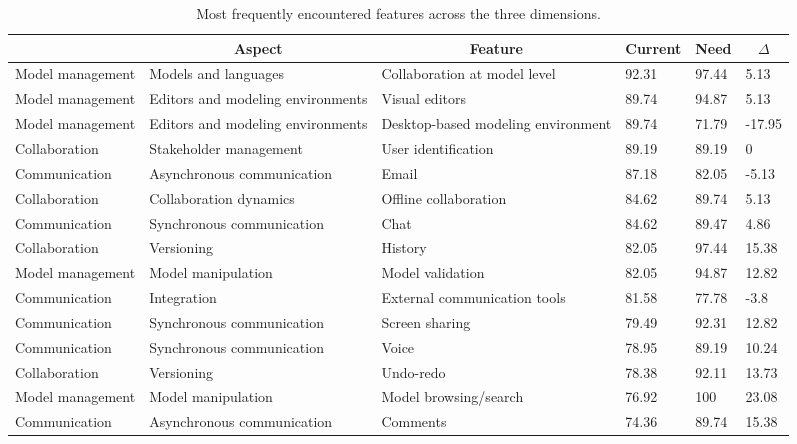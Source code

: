 
  \begin{table*}[]
  \centering
  \notsotiny
  \caption{ Most frequently encountered features across the three dimensions.}
\label{tab:most-frequent}
\begin{tabular}{|l|l|l|l|l|l|}
  \hline
  \rowcolor[HTML]{C0C0C0}
    \multicolumn{1}{|c|}{Dimension} & \multicolumn{1}{c|}{Aspect} & \multicolumn{1}{c|}{Feature} & \multicolumn{1}{c|}{Current} & \multicolumn{1}{c|}{Need} & \multicolumn{1}{c|}{$\Delta$} \\ \hline
    Model management & Models and languages & Collaboration at model level & 92.31 & 97.44 & 5.13 \\ \hline 
Model management & Editors and modeling environments & Visual editors & 89.74 & 94.87 & 5.13 \\ \hline 
Model management & Editors and modeling environments & Desktop-based modeling environment & 89.74 & 71.79 & -17.95 \\ \hline 
Collaboration & Stakeholder management & User identification & 89.19 & 89.19 & 0 \\ \hline 
Communication & Asynchronous communication & Email & 87.18 & 82.05 & -5.13 \\ \hline 
Collaboration & Collaboration dynamics & Offline collaboration & 84.62 & 89.74 & 5.13 \\ \hline 
Communication & Synchronous communication & Chat & 84.62 & 89.47 & 4.86 \\ \hline 
Collaboration & Versioning & History & 82.05 & 97.44 & 15.38 \\ \hline 
Model management & Model manipulation & Model validation & 82.05 & 94.87 & 12.82 \\ \hline 
Communication & Integration & External communication tools & 81.58 & 77.78 & -3.8 \\ \hline 
Communication & Synchronous communication & Screen sharing & 79.49 & 92.31 & 12.82 \\ \hline 
Communication & Synchronous communication & Voice & 78.95 & 89.19 & 10.24 \\ \hline 
Collaboration & Versioning & Undo-redo & 78.38 & 92.11 & 13.73 \\ \hline 
Model management & Model manipulation & Model browsing/search & 76.92 & 100 & 23.08 \\ \hline 
Communication & Asynchronous communication & Comments & 74.36 & 89.74 & 15.38 \\ \hline 

\end{tabular}
\end{table*}
